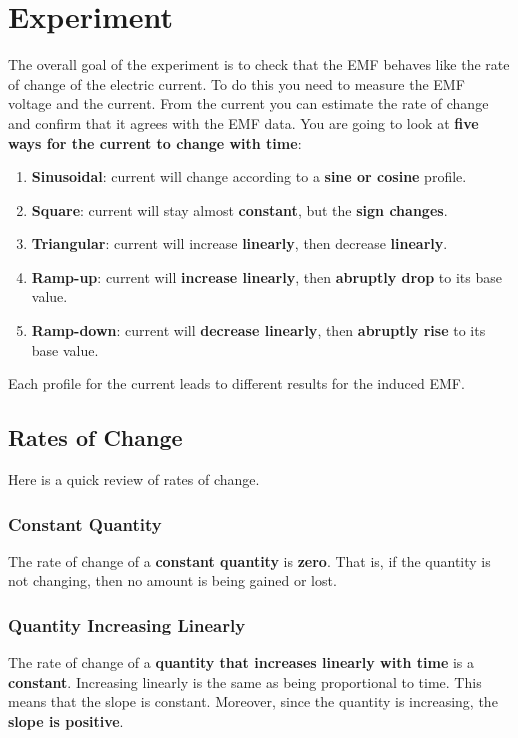 \section{Experiment}
The overall goal of the experiment is to check that the EMF behaves like the rate of change of the electric current. To do this you need to measure the EMF voltage and the current. From the current you can estimate the rate of change and confirm that it agrees with the EMF data. You are going to look at \textbf{five ways for the current to change with time}:
\begin{enumerate}
	\item \textbf{Sinusoidal}: current will change according to a \textbf{sine or cosine} profile.
	\item \textbf{Square}: current will stay almost \textbf{constant}, but the \textbf{sign changes}.
	\item \textbf{Triangular}: current will increase \textbf{linearly}, then decrease \textbf{linearly}.
	\item \textbf{Ramp-up}: current will \textbf{increase linearly}, then \textbf{abruptly drop} to its base value.
	\item \textbf{Ramp-down}: current will \textbf{decrease linearly}, then \textbf{abruptly rise} to its base value.
\end{enumerate}
Each profile for the current leads to different results for the induced EMF.
\subsection{Rates of Change}
Here is a quick review of rates of change.
\subsubsection{Constant Quantity}
The rate of change of a \textbf{constant quantity} is \textbf{zero}. That is, if the quantity is not changing, then no amount is being gained or lost.
\subsubsection{Quantity Increasing Linearly}
The rate of change of a \textbf{quantity that increases linearly with time} is a \textbf{constant}. Increasing linearly is the same as being proportional to time. This means that the slope is constant. Moreover, since the quantity is increasing, the \textbf{slope is positive}.
